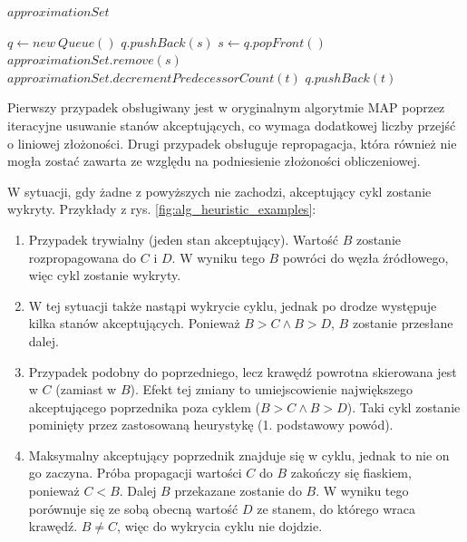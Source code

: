 \begin{algorithm}
\caption{$ eliminateNoPredecessors(approximationSet) $}
\label{alg:eliminateNoPredecessors}
\begin{algorithmic}[1]
\REQUIRE $ approximationSet $

\STATE $ q \leftarrow new\ Queue() $
    \STATE $ q.pushBack(s) $
  \ENDIF
\ENDFOR
{}
  \STATE $ s \leftarrow q.popFront() $
  \STATE $ approximationSet.remove(s) $
    \STATE $ approximationSet.decrementPredecessorCount(t) $
      \STATE $ q.pushBack(t) $
    \ENDIF
  \ENDFOR
\ENDWHILE
\end{algorithmic}
\end{algorithm}

Pierwszy przypadek obsługiwany jest w oryginalnym algorytmie MAP poprzez iteracyjne usuwanie stanów akceptujących, co wymaga dodatkowej liczby przejść o liniowej złożoności.
Drugi przypadek obsługuje repropagacja, która również nie mogła zostać zawarta ze względu na podniesienie złożoności obliczeniowej.

W sytuacji, gdy żadne z powyższych nie zachodzi, akceptujący cykl zostanie wykryty.
Przykłady z rys. \ref{fig:alg_heuristic_examples}:
\begin{enumerate}[label=(\alph*)]
\item Przypadek trywialny (jeden stan akceptujący). Wartość $B$ zostanie rozpropagowana do $C$ i $D$. W wyniku tego $B$ powróci do węzła źródłowego, więc cykl zostanie wykryty.
\item W tej sytuacji także nastąpi wykrycie cyklu, jednak po drodze występuje kilka stanów akceptujących. Ponieważ $ B > C \land B > D $, $B$ zostanie przesłane dalej.
\item Przypadek podobny do poprzedniego, lecz krawędź powrotna skierowana jest w $C$ (zamiast w $B$). Efekt tej zmiany to umiejscowienie największego akceptującego poprzednika poza cyklem ($ B > C \land B > D $). Taki cykl zostanie pominięty przez zastosowaną heurystykę (1. podstawowy powód).
\item Maksymalny akceptujący poprzednik znajduje się w cyklu, jednak to nie on go zaczyna. Próba propagacji wartości $C$ do $B$ zakończy się fiaskiem, ponieważ $ C < B $. Dalej $B$ przekazane zostanie do $B$. W wyniku tego porównuje się ze sobą obecną wartość $D$ ze stanem, do którego wraca krawędź. $ B \neq C $, więc do wykrycia cyklu nie dojdzie.
\end{enumerate}


